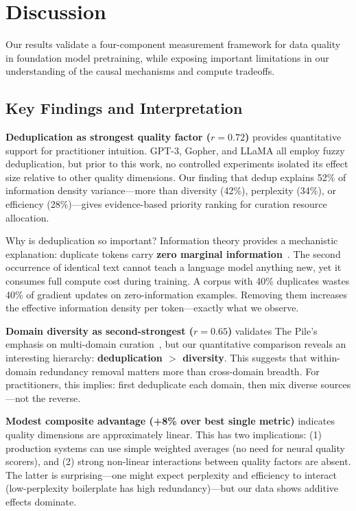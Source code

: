 \section{Discussion}

Our results validate a four-component measurement framework for data quality in foundation model pretraining, while exposing important limitations in our understanding of the causal mechanisms and compute tradeoffs.

\subsection{Key Findings and Interpretation}

\textbf{Deduplication as strongest quality factor ($r = 0.72$)} provides quantitative support for practitioner intuition. GPT-3, Gopher, and LLaMA all employ fuzzy deduplication, but prior to this work, no controlled experiments isolated its effect size relative to other quality dimensions. Our finding that dedup explains 52\% of information density variance---more than diversity (42\%), perplexity (34\%), or efficiency (28\%)---gives evidence-based priority ranking for curation resource allocation.

Why is deduplication so important? Information theory provides a mechanistic explanation: duplicate tokens carry \textbf{zero marginal information}~\cite{shannon1948mathematical}. The second occurrence of identical text cannot teach a language model anything new, yet it consumes full compute cost during training. A corpus with 40\% duplicates wastes 40\% of gradient updates on zero-information examples. Removing them increases the effective information density per token---exactly what we observe.

\textbf{Domain diversity as second-strongest ($r = 0.65$)} validates The Pile's emphasis on multi-domain curation~\cite{gao2020pile}, but our quantitative comparison reveals an interesting hierarchy: \textbf{deduplication $>$ diversity}. This suggests that within-domain redundancy removal matters more than cross-domain breadth. For practitioners, this implies: first deduplicate each domain, then mix diverse sources---not the reverse.

\textbf{Modest composite advantage (+8\% over best single metric)} indicates quality dimensions are approximately linear. This has two implications: (1) production systems can use simple weighted averages (no need for neural quality scorers), and (2) strong non-linear interactions between quality factors are absent. The latter is surprising---one might expect perplexity and efficiency to interact (low-perplexity boilerplate has high redundancy)---but our data shows additive effects dominate.

